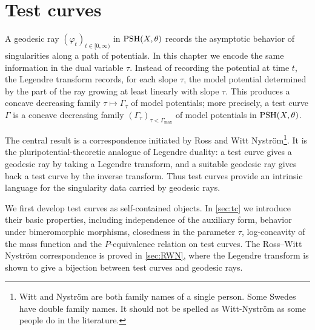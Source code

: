\chapter{Test curves}
\label{chap:testcurve}

A geodesic ray $(\varphi_t)_{t\in[0,\infty)}$ in $\mathrm{PSH}(X,\theta)$ records the asymptotic behavior of singularities along a path of potentials. In this chapter we encode the same information in the dual variable $\tau$. Instead of recording the potential at time $t$, the Legendre transform records, for each slope $\tau$, the model potential determined by the part of the ray growing at least linearly with slope $\tau$. This produces a concave decreasing family $\tau\mapsto\Gamma_\tau$ of model potentials; more precisely, a test curve $\Gamma$ is a concave decreasing family $(\Gamma_\tau)_{\tau<\Gamma_{\max}}$ of model potentials in $\mathrm{PSH}(X,\theta)$.

The central result is a correspondence initiated by Ross and Witt Nystr\"om\footnote{Witt and Nystr\"om are both family names of a single person. Some Swedes have double family names. It should not be spelled as Witt-Nystr\"om as some people do in the literature.}. It is the pluripotential-theoretic analogue of Legendre duality: a test curve gives a geodesic ray by taking a Legendre transform, and a suitable geodesic ray gives back a test curve by the inverse transform. Thus test curves provide an intrinsic language for the singularity data carried by geodesic rays.

We first develop test curves as self-contained objects. In \cref{sec:tc} we introduce their basic properties, including independence of the auxiliary form, behavior under bimeromorphic morphisms, closedness in the parameter $\tau$, log-concavity of the mass function and the $P$-equivalence relation on test curves. The Ross--Witt Nystr\"om correspondence is proved in \cref{sec:RWN}, where the Legendre transform is shown to give a bijection between test curves and geodesic rays.

